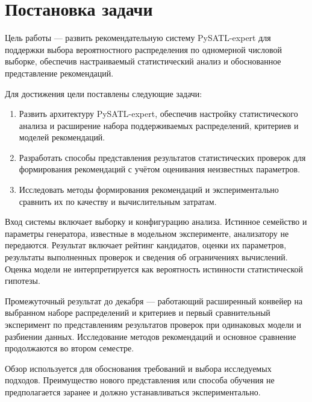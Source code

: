 \section{Постановка задачи}
\label{sec:task}

Цель работы --- развить рекомендательную систему PySATL-expert для поддержки
выбора вероятностного распределения по одномерной числовой выборке, обеспечив
настраиваемый статистический анализ и обоснованное представление рекомендаций.

Для достижения цели поставлены следующие задачи:
\begin{enumerate}
    \item Развить архитектуру PySATL-expert, обеспечив настройку статистического
    анализа и расширение набора поддерживаемых распределений, критериев
    и моделей рекомендаций.
    \item Разработать способы представления результатов статистических
    проверок для формирования рекомендаций с учётом оценивания неизвестных
    параметров.
    \item Исследовать методы формирования рекомендаций и экспериментально
    сравнить их по качеству и вычислительным затратам.
\end{enumerate}

Вход системы включает выборку и конфигурацию анализа. Истинное семейство
и параметры генератора, известные в модельном эксперименте, анализатору
не передаются. Результат включает рейтинг кандидатов, оценки их параметров,
результаты выполненных проверок и сведения об ограничениях вычислений.
Оценка модели не интерпретируется как вероятность истинности
статистической гипотезы.

Промежуточный результат до декабря --- работающий расширенный конвейер
на выбранном наборе распределений и критериев и первый сравнительный
эксперимент по представлениям результатов проверок при одинаковых модели
и разбиении данных. Исследование методов рекомендаций и основное сравнение
продолжаются во втором семестре.

Обзор используется для обоснования требований и выбора исследуемых
подходов. Преимущество нового представления или способа обучения
не предполагается заранее и должно устанавливаться экспериментально.
